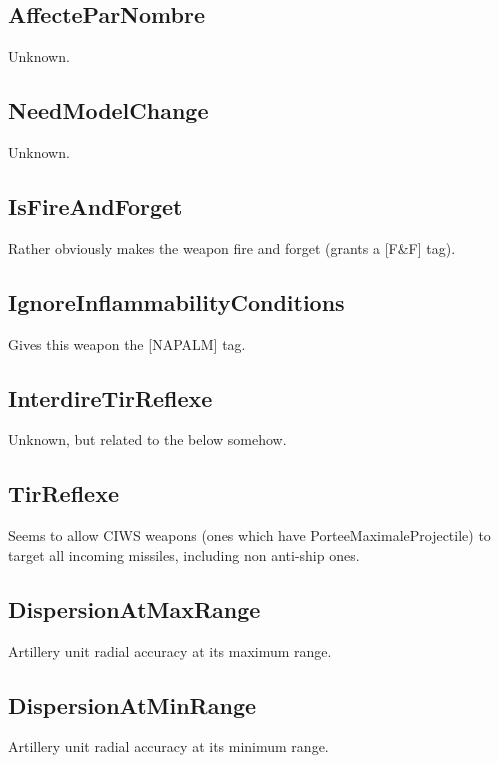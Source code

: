 \documentclass{article}
\begin{document}
\subsection{AffecteParNombre}

Unknown.

\subsection{NeedModelChange}

Unknown.

\subsection{IsFireAndForget}

Rather obviously makes the weapon fire and forget (grants a [F\&F] tag).

\subsection{IgnoreInflammabilityConditions}

Gives this weapon the [NAPALM] tag.

\subsection{InterdireTirReflexe}

Unknown, but related to the below somehow.

\subsection{TirReflexe}

Seems to allow CIWS weapons (ones which have PorteeMaximaleProjectile) to target all incoming missiles, including non anti-ship ones.

\subsection{DispersionAtMaxRange}

Artillery unit radial accuracy at its maximum range.

\subsection{DispersionAtMinRange}

Artillery unit radial accuracy at its minimum range.
\end{document}
